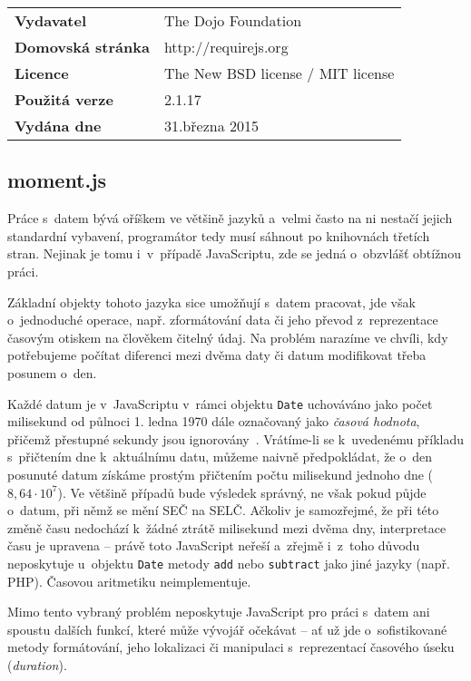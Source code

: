 		\vspace{\baselineskip}
		\renewcommand{\arraystretch}{1.3}
		\noindent
		\begin{tabularx}{\textwidth}{|lX|}
		\hline
		\bf Vydavatel & The Dojo Foundation \\
		\bf Domovská stránka & http://requirejs.org\\
		\bf Licence & The New BSD license / MIT license \\
		\bf Použitá verze & 2.1.17 \\
		\bf Vydána dne & 31.\ts března 2015\\
		\hline
		\end{tabularx}
			
		\subsection{\sf moment.js}
			\label{momentjs}
			Práce s~datem bývá oříškem ve většině jazyků a~velmi často na ni nestačí jejich standardní vybavení, programátor tedy musí sáhnout po knihovnách třetích stran. Nejinak je tomu i~v~případě JavaScriptu, zde se jedná o~obzvlášť obtížnou práci.
			
			Základní objekty tohoto jazyka sice umožňují s~datem pracovat, jde však o~jednoduché operace, např. zformátování data či jeho převod z~reprezentace časovým otiskem na člověkem čitelný údaj. Na problém narazíme ve chvíli, kdy potřebujeme počítat diferenci mezi dvěma daty či datum modifikovat třeba posunem o~den.
			
			Každé datum je v~JavaScriptu v~rámci objektu {\tt Date} uchováváno jako počet milisekund od půlnoci 1. ledna 1970 dále označovaný jako \emph{časová hodnota}, přičemž přes\-tupné sekundy jsou ignorovány~\cite{ecma-2011}. Vrátíme-li se k~uvedenému příkladu s~při\-čtením dne k~aktuálnímu datu, můžeme naivně předpokládat, že o~den posunuté datum získáme prostým přičtením počtu milisekund jednoho dne ($8,\!64\cdot10^7$). Ve většině případů bude výsledek správný, ne však pokud půjde o~datum, při němž se mění SEČ na SELČ. Ačkoliv je samozřejmé, že při této změně času nedochází k~žádné ztrátě milisekund mezi dvěma dny, interpretace času je upravena -- právě toto JavaScript neřeší a~zřejmě i~z~toho důvodu neposkytuje u~objektu {\tt Date} metody {\tt add} nebo {\tt subtract} jako jiné jazyky (např. PHP). Časovou aritmetiku neimplementuje.
			
			Mimo tento vybraný problém neposkytuje JavaScript pro práci s~datem ani spoustu dalších funkcí, které může vývojář očekávat -- ať už jde o~sofistikované metody formátování, jeho lokalizaci či manipulaci s~reprezentací časového úseku (\emph{duration}).
			
